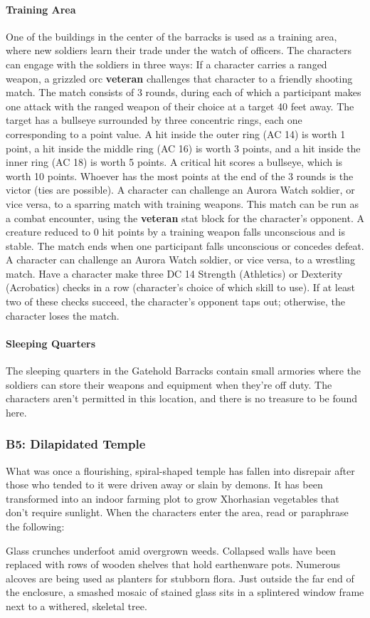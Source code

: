 \documentclass[10pt,a4,twoside,twocolumn,openany,nodeprecatedcode]{dndbook}
\begin{document}
\paragraph{Training Area}
One of the buildings in the center of the barracks is used as a training area, where new soldiers learn their trade under the watch of officers. The characters can engage with the soldiers in three ways:
{{If a character carries a ranged weapon, a grizzled orc \textbf{veteran} challenges that character to a friendly shooting match. The match consists of 3 rounds, during each of which a participant makes one attack with the ranged weapon of their choice at a target 40 feet away. The target has a bullseye surrounded by three concentric rings, each one corresponding to a point value. A hit inside the outer ring (AC 14) is worth 1 point, a hit inside the middle ring (AC 16) is worth 3 points, and a hit inside the inner ring (AC 18) is worth 5 points. A critical hit scores a bullseye, which is worth 10 points. Whoever has the most points at the end of the 3 rounds is the victor (ties are possible).}}
{{A character can challenge an Aurora Watch soldier, or vice versa, to a sparring match with training weapons. This match can be run as a combat encounter, using the \textbf{veteran} stat block for the character's opponent. A creature reduced to 0 hit points by a training weapon falls unconscious and is stable. The match ends when one participant falls unconscious or concedes defeat.}}
{{A character can challenge an Aurora Watch soldier, or vice versa, to a wrestling match. Have a character make three DC 14 Strength (Athletics) or Dexterity (Acrobatics) checks in a row (character's choice of which skill to use). If at least two of these checks succeed, the character's opponent taps out; otherwise, the character loses the match.}}
\paragraph{Sleeping Quarters}
The sleeping quarters in the Gatehold Barracks contain small armories where the soldiers can store their weapons and equipment when they're off duty.
The characters aren't permitted in this location, and there is no treasure to be found here.
\subsubsection{B5: Dilapidated Temple}
What was once a flourishing, spiral-shaped temple has fallen into disrepair after those who tended to it were driven away or slain by demons. It has been transformed into an indoor farming plot to grow Xhorhasian vegetables that don't require sunlight.
When the characters enter the area, read or paraphrase the following:
\begin{DndReadAloud}{}
Glass crunches underfoot amid overgrown weeds. Collapsed walls have been replaced with rows of wooden shelves that hold earthenware pots. Numerous alcoves are being used as planters for stubborn flora. Just outside the far end of the enclosure, a smashed mosaic of stained glass sits in a splintered window frame next to a withered, skeletal tree.
\end{DndReadAloud}
\end{document}
